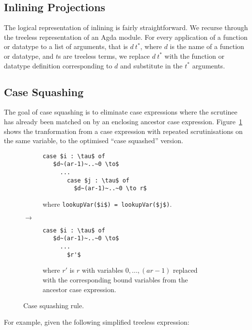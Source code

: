 \subsection{Inlining Projections}

The logical representation of inlining is fairly straightforward. We recurse through the treeless representation of an Agda module. For every application of a function or datatype to a list of arguments, that is $d~t^*$, where $d$ is the name of a function or datatype, and $t$s are treeless terms, we replace $d~t^*$ with the function or datatype definition corresponding to $d$ and substitute in the $t^*$ arguments.

\subsection{Case Squashing}

The goal of case squashing is to eliminate case expressions where the scrutinee has already been matched on by an enclosing ancestor case expression. Figure~\ref{fig:case_squash_rule} shows the tranformation from a case expression with repeated scrutinisations on the same variable, to the optimised ``case squashed'' version.

\begin{figure}[h]
\centering
\begin{subfigure}{.47\textwidth}
  \centering
  \begin{lstlisting}[style=math]
  case $i : \tau$ of
   $d~(ar-1)~..~0 \to$
     ...
       case $j : \tau$ of
         $d~(ar-1)~..~0 \to r$
  \end{lstlisting}
  where \lstinline[style=math]{lookupVar($i$) = lookupVar($j$)}.
\end{subfigure}
{\large$\to$}
\begin{subfigure}{.47\textwidth}
  \centering
  \begin{lstlisting}[style=math]
  case $i : \tau$ of
   $d~(ar-1)~..~0 \to$
     ...
       $r'$
  \end{lstlisting}
  where $r'$ is $r$ with variables $0, ..., (ar-1)$ replaced with the corresponding bound variables from the ancestor case expression.
\end{subfigure}
\caption{Case squashing rule.}
\label{fig:case_squash_rule}
\end{figure}


For example, given the following simplified treeless expression:

